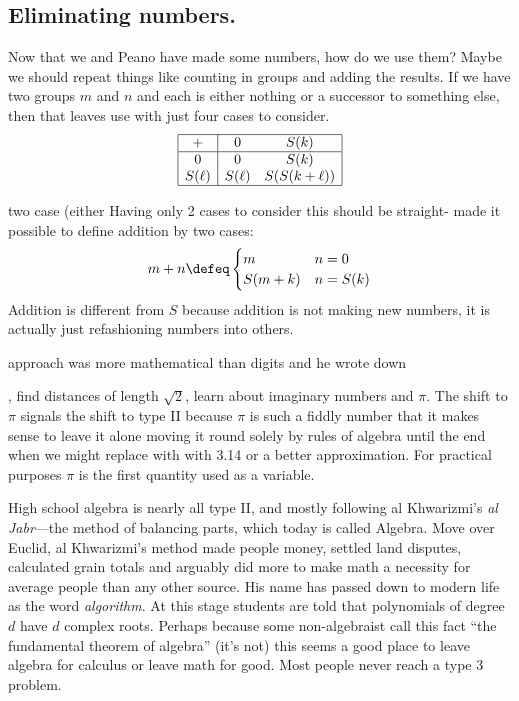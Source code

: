 \subsection{Eliminating numbers.}
Now that we and Peano have made some numbers, how do we use them?
Maybe we should repeat things like counting in groups and adding the 
results.  If we have two groups $m$ and $n$ and each is either nothing 
or a successor to something else, then that leaves use with just four cases 
to consider.
\begin{align*}
    \begin{array}{|c|cc|}
        \hline 
        + & 0 & S(k)\\
        \hline 
        0 & 0 & S(k) \\
        S(\ell) & S(\ell) & S(S(k+\ell))\\
        \hline
    \end{array}
\end{align*}

two case (either Having only 2 cases to consider this should be straight- made 
it possible to define addition by two cases:
\begin{align*}
    m+n \defeq \begin{cases} m & n=0\\ S(m+k) & n=S(k)\end{cases}
\end{align*}
Addition is different from $S$ because addition is not making new 
numbers, it is actually just refashioning numbers into others.

approach was 
more mathematical than digits and he wrote down 

, find distances of
length $\sqrt{2}$, learn about imaginary numbers and $\pi$.  The shift to $\pi$
signals the shift to type II because $\pi$ is such a fiddly number that it
makes sense to leave it alone moving it round solely by rules of algebra until
the end when we might replace with with 3.14 or a better approximation. For
practical purposes $\pi$ is the first quantity used as a variable. 

High school algebra is nearly all type II, and mostly following al
Khwarizmi's \emph{al Jabr}---the method of balancing parts, which today is
called Algebra.  Move over Euclid, al Khwarizmi's method made people money,
settled land disputes, calculated grain totals and arguably did more to make
math a necessity for average people than any other source. His name has passed
down to modern life as the word \emph{algorithm}. At this stage students are
told  that polynomials of degree $d$ have $d$ complex roots.  Perhaps because
some non-algebraist call this fact ``the fundamental theorem of algebra'' (it's
not) this seems a good place to leave algebra for calculus or leave math for
good.  Most people never reach a type 3 problem.

